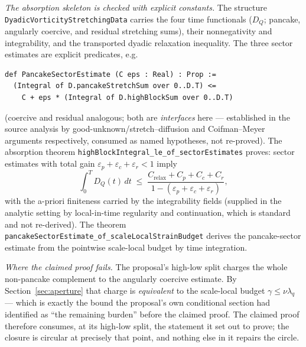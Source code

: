 \documentclass[11pt]{article}
\theoremstyle{definition}
\begin{document}
\emph{The absorption skeleton is checked with explicit constants.}  The
structure \texttt{DyadicVorticityStretchingData} carries the four time
functionals ($D_Q$; pancake, angularly coercive, and residual stretching
sums), their nonnegativity and integrability, and the transported dyadic
relaxation inequality.  The three sector estimates are explicit predicates,
e.g.
\begin{lstlisting}[language={}]
def PancakeSectorEstimate (C eps : Real) : Prop :=
  (Integral of D.pancakeStretchSum over 0..D.T) <=
    C + eps * (Integral of D.highBlockSum over 0..D.T)
\end{lstlisting}
(coercive and residual analogous; both are \emph{interfaces} here ---
established in the source analysis by good-unknown/stretch--diffusion and
Coifman--Meyer arguments respectively, consumed as named hypotheses, not
re-proved).  The absorption theorem
\texttt{highBlockIntegral\_le\_of\_sectorEstimates} proves: sector estimates
with total gain $\varepsilon_p+\varepsilon_c+\varepsilon_r<1$ imply
\[
  \int_0^T D_Q(t)\,dt \;\le\;
  \frac{C_{\mathrm{relax}} + C_p + C_c + C_r}
       {1-(\varepsilon_p+\varepsilon_c+\varepsilon_r)} ,
\]
with the a-priori finiteness carried by the integrability fields (supplied in
the analytic setting by local-in-time regularity and continuation, which is
standard and not re-derived).  The theorem
\texttt{pancakeSectorEstimate\_of\_scaleLocalStrainBudget} derives the
pancake-sector estimate from the pointwise scale-local budget by time
integration.

\emph{Where the claimed proof fails.}  The proposal's high-low split charges
the whole non-pancake complement to the angularly coercive estimate.  By
Section~\ref{sec:aperture} that charge is \emph{equivalent} to the
scale-local budget $\gamma\le\nu\lambda_q$ --- which is exactly the bound the
proposal's own conditional section had identified as ``the remaining
burden'' before the claimed proof.  The claimed proof therefore consumes, at
its high-low split, the statement it set out to prove; the closure is
circular at precisely that point, and nothing else in it repairs the circle.
\end{document}
